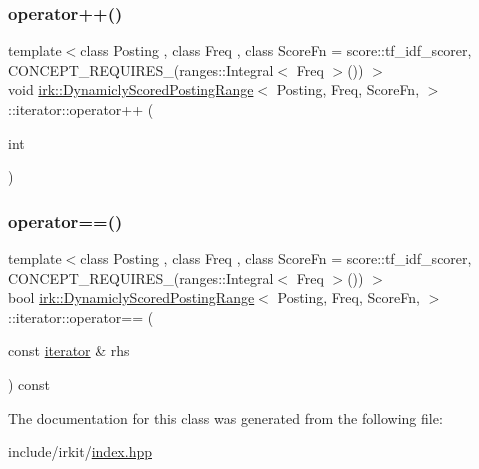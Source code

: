 \mbox{\label{classirk_1_1DynamiclyScoredPostingRange_1_1iterator_a51f9d9fe9f3e6b8ad8f19c38d9118f0b}} 
\subsubsection{\texorpdfstring{operator++()}{operator++()}\hspace{0.1cm}{\footnotesize\ttfamily [2/2]}}
{\footnotesize\ttfamily template$<$class Posting , class Freq , class Score\+Fn  = score\+::tf\+\_\+idf\+\_\+scorer, C\+O\+N\+C\+E\+P\+T\+\_\+\+R\+E\+Q\+U\+I\+R\+E\+S\+\_\+(ranges\+::\+Integral$<$ Freq $>$()) $>$ \\
void \mbox{\hyperlink{classirk_1_1DynamiclyScoredPostingRange}{irk\+::\+Dynamicly\+Scored\+Posting\+Range}}$<$ Posting, Freq, Score\+Fn, $>$\+::iterator\+::operator++ (\begin{DoxyParamCaption}\item[{int}]{ }\end{DoxyParamCaption})\hspace{0.3cm}{\ttfamily [inline]}}

\mbox{\label{classirk_1_1DynamiclyScoredPostingRange_1_1iterator_a4bd7992936beab5e3f67f383f9a8ebf3}} 
\subsubsection{\texorpdfstring{operator==()}{operator==()}}
{\footnotesize\ttfamily template$<$class Posting , class Freq , class Score\+Fn  = score\+::tf\+\_\+idf\+\_\+scorer, C\+O\+N\+C\+E\+P\+T\+\_\+\+R\+E\+Q\+U\+I\+R\+E\+S\+\_\+(ranges\+::\+Integral$<$ Freq $>$()) $>$ \\
bool \mbox{\hyperlink{classirk_1_1DynamiclyScoredPostingRange}{irk\+::\+Dynamicly\+Scored\+Posting\+Range}}$<$ Posting, Freq, Score\+Fn, $>$\+::iterator\+::operator== (\begin{DoxyParamCaption}\item[{const \mbox{\hyperlink{classirk_1_1DynamiclyScoredPostingRange_1_1iterator}{iterator}} \&}]{rhs }\end{DoxyParamCaption}) const\hspace{0.3cm}{\ttfamily [inline]}}



The documentation for this class was generated from the following file\+:\begin{DoxyCompactItemize}
\item 
include/irkit/\mbox{\hyperlink{irkit_2index_8hpp}{index.\+hpp}}\end{DoxyCompactItemize}
